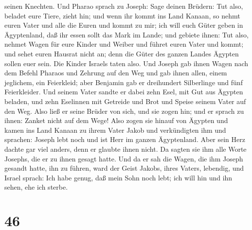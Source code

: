 seinen Knechten.  Und Pharao sprach zu Joseph: Sage deinen
Brüdern: Tut also, beladet eure Tiere, zieht hin;  und wenn
ihr kommt ins Land Kanaan, so nehmt euren Vater und alle die Euren und
kommt zu mir; ich will euch Güter geben in Ägyptenland, daß ihr essen
sollt das Mark im Lande;  und gebiete ihnen: Tut also,
nehmet Wagen für eure Kinder und Weiber und führet euren Vater und
kommt;  und sehet euren Hausrat nicht an; denn die Güter
des ganzen Landes Ägypten sollen euer sein.  Die Kinder
Israels taten also. Und Joseph gab ihnen Wagen nach dem Befehl Pharaos
und Zehrung auf den Weg  und gab ihnen allen, einem
jeglichem, ein Feierkleid; aber Benjamin gab er dreihundert Silberlinge
und fünf Feierkleider.  Und seinem Vater sandte er dabei
zehn Esel, mit Gut aus Ägypten beladen, und zehn Eselinnen mit Getreide
und Brot und Speise seinem Vater auf den Weg.  Also ließ er
seine Brüder von sich, und sie zogen hin; und er sprach zu ihnen: Zanket
nicht auf dem Wege!  Also zogen sie hinauf von Ägypten und
kamen ins Land Kanaan zu ihrem Vater Jakob  und
verkündigten ihm und sprachen: Joseph lebt noch und ist Herr im ganzen
Ägyptenland. Aber sein Herz dachte gar viel anders, denn er glaubte
ihnen nicht.  Da sagten sie ihm alle Worte Josephs, die er
zu ihnen gesagt hatte. Und da er sah die Wagen, die ihm Joseph gesandt
hatte, ihn zu führen, ward der Geist Jakobs, ihres Vaters, lebendig,
 und Israel sprach: Ich habe genug, daß mein Sohn noch
lebt; ich will hin und ihn sehen, ehe ich sterbe.

\hypertarget{section-45}{%
\section{46}\label{section-45}}

